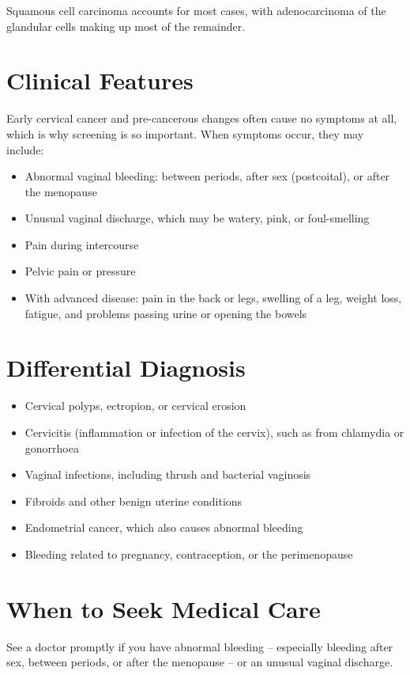 Squamous cell carcinoma accounts for most cases, with adenocarcinoma of the glandular cells making up most of the remainder.

\section*{Clinical Features}
Early cervical cancer and pre-cancerous changes often cause no symptoms at all, which is why screening is so important. When symptoms occur, they may include:

\begin{itemize}
    \item Abnormal vaginal bleeding: between periods, after sex (postcoital), or after the menopause
    \item Unusual vaginal discharge, which may be watery, pink, or foul-smelling
    \item Pain during intercourse
    \item Pelvic pain or pressure
    \item With advanced disease: pain in the back or legs, swelling of a leg, weight loss, fatigue, and problems passing urine or opening the bowels
\end{itemize}

\section*{Differential Diagnosis}
\begin{itemize}
    \item Cervical polyps, ectropion, or cervical erosion
    \item Cervicitis (inflammation or infection of the cervix), such as from chlamydia or gonorrhoea
    \item Vaginal infections, including thrush and bacterial vaginosis
    \item Fibroids and other benign uterine conditions
    \item Endometrial cancer, which also causes abnormal bleeding
    \item Bleeding related to pregnancy, contraception, or the perimenopause
\end{itemize}

\section*{When to Seek Medical Care}
See a doctor promptly if you have abnormal bleeding -- especially bleeding after sex, between periods, or after the menopause -- or an unusual vaginal discharge.

